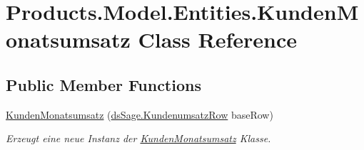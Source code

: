 \hypertarget{class_products_1_1_model_1_1_entities_1_1_kunden_monatsumsatz}{}\section{Products.\+Model.\+Entities.\+Kunden\+Monatsumsatz Class Reference}
\label{class_products_1_1_model_1_1_entities_1_1_kunden_monatsumsatz}
\subsection*{Public Member Functions}
\begin{DoxyCompactItemize}
\item 
\hyperlink{class_products_1_1_model_1_1_entities_1_1_kunden_monatsumsatz_ab20e1bfaca69dd3c14d7a95f62884fe3}{Kunden\+Monatsumsatz} (\hyperlink{class_products_1_1_data_1_1ds_sage_1_1_kundenumsatz_row}{ds\+Sage.\+Kundenumsatz\+Row} base\+Row)
\begin{DoxyCompactList}\small\item\em Erzeugt eine neue Instanz der \hyperlink{class_products_1_1_model_1_1_entities_1_1_kunden_monatsumsatz}{Kunden\+Monatsumsatz} Klasse. \end{DoxyCompactList}\end{DoxyCompactItemize}
